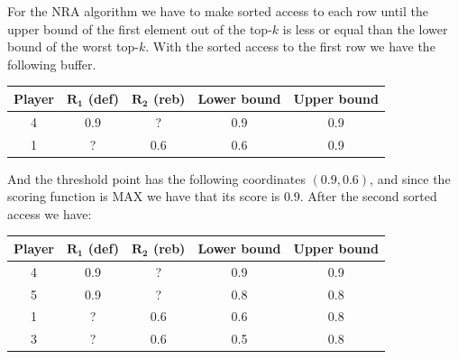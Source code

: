 \begin{enumerate}
        For the NRA algorithm we have to make sorted access to each row until the upper bound of the first element out of the top-$k$ is less
        or equal than the lower bound of the worst top-$k$. With the sorted access to the first row we have the following buffer. 
        \begin{table}[H]
            \centering
            \begin{tabular}{c|cc|cc}
            \hline
            \textbf{Player} & \textbf{$\boldsymbol{R_1}$ (def)} & \textbf{$\boldsymbol{R_2}$ (reb)} & \textbf{Lower bound} & \textbf{Upper bound} \\ \hline
            4               & 0.9                               & ?                                 & 0.9                  & 0.9                  \\
            1               & ?                                 & 0.6                               & 0.6                  & 0.9                  \\ \hline
            \end{tabular}
        \end{table}
        And the threshold point has the following coordinates $(0.9,0.6)$, and since the scoring function is MAX we have that its score is $0.9$.
        After the second sorted access we have: 
        \begin{table}[H]
            \centering
            \begin{tabular}{c|cc|cc}
            \hline
            \textbf{Player} & \textbf{$\boldsymbol{R_1}$ (def)} & \textbf{$\boldsymbol{R_2}$ (reb)} & \textbf{Lower bound} & \textbf{Upper bound} \\ \hline
            4               & 0.9                               & ?                                 & 0.9                  & 0.9                  \\
            5               & 0.9                               & ?                                 & 0.8                  & 0.8                  \\
            1               & ?                                 & 0.6                               & 0.6                  & 0.8                  \\
            3               & ?                                 & 0.6                               & 0.5                  & 0.8                  \\ \hline
            \end{tabular}
        \end{table}

\end{enumerate}
